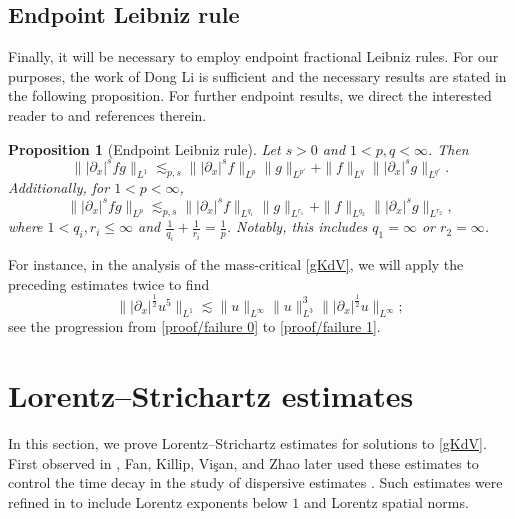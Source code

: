 \documentclass[10pt, reqno]{amsart}
\numberwithin{equation}{section}
\newtheorem{proposition}[theorem]{Proposition}
\theoremstyle{definition}
\theoremstyle{remark}
\begin{document}
\subsection{Endpoint Leibniz rule}
    Finally, it will be necessary to employ endpoint fractional Leibniz rules. For our purposes, the work of Dong Li \cite{endpoint-Leibniz} is sufficient and the necessary results are stated in the following proposition. For further endpoint results, we direct the interested reader to \cite{endpoint-Leibniz-4,endpoint-Leibniz-3, endpoint-Leibniz-2} and references therein.
    \begin{proposition}[Endpoint Leibniz rule]\label{prel/leibniz}
        Let $s > 0$ and $1 < p,q < \infty$. Then
        \begin{equation*}
            \||\partial_x|^s fg\|_{L^1} \lesssim_{p,s} \big\||\partial_x|^sf\big\|_{L^p}\|g\|_{L^{p'}} + \|f\|_{L^q}\big\||\partial_x|^s g\big\|_{L^{q'}}.
        \end{equation*}
        Additionally, for $1 < p < \infty$,
        \begin{equation*}
            \||\partial_x|^s fg\|_{L^p} \lesssim_{p,s} \big\||\partial_x|^sf\big\|_{L^{q_1}}\|g\|_{L^{r_1}} + \|f\|_{L^{q_2}}\big\||\partial_x|^s g\big\|_{L^{r_2}},
        \end{equation*}
        where $1 < q_i, r_i \leq \infty$ and $\frac{1}{q_i} + \frac{1}{r_i} = \frac{1}{p}$. Notably, this includes $q_1 = \infty$ or $r_2 = \infty$.
    \end{proposition}
    For instance, in the analysis of the mass-critical \eqref{gKdV}, we will apply the preceding estimates twice to find
    \begin{equation}\label{prel/endpoint product}
        \big\| |\partial_x|^\frac{1}{2} u^5 \big\|_{L^1} \lesssim \|u\|_{L^\infty} \|u\|_{L^3}^3 \big\||\partial_x|^\frac{1}{2} u\big\|_{L^\infty};
    \end{equation}
    see the progression from \eqref{proof/failure 0} to \eqref{proof/failure 1}.


    
\section{Lorentz--Strichartz estimates}
In this section, we prove Lorentz--Strichartz estimates for solutions to \eqref{gKdV}. First observed in \cite{lorentz-strichartz}, Fan, Killip, Vi\c{s}an, and Zhao later used these estimates to control the time decay in the study of dispersive estimates \cite{FKVZ24}. Such estimates were refined in \cite{Kowal24} to include Lorentz exponents below $1$ and Lorentz spatial norms.
\end{document}
